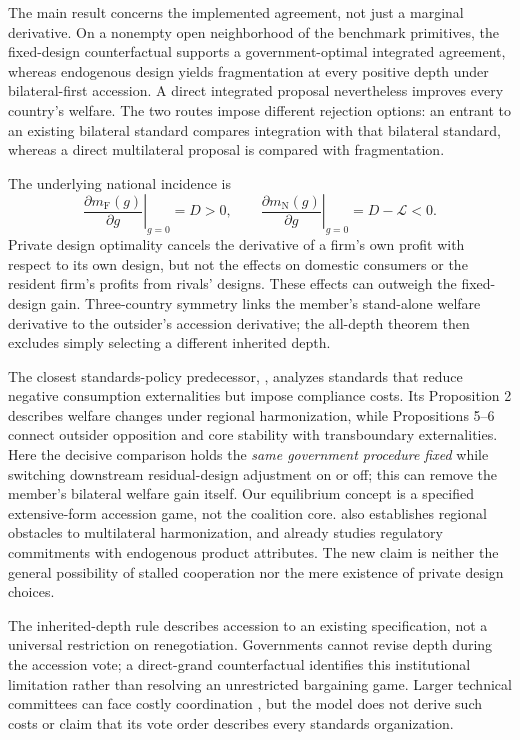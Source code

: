 \documentclass[11pt,a4paper]{article}
\theoremstyle{remark}\newtheorem{remark}[theorem]{Remark}
\newcommand{\N}{\mathrm{N}}\newcommand{\F}{\mathrm{F}}
\newcommand{\loss}{\mathcal L}\newcommand{\vect}[1]{\boldsymbol{#1}}
\begin{document}
The main result concerns the implemented agreement, not just a marginal derivative. On a nonempty open neighborhood of the benchmark primitives, the fixed-design counterfactual supports a government-optimal integrated agreement, whereas endogenous design yields fragmentation at every positive depth under bilateral-first accession. A direct integrated proposal nevertheless improves every country's welfare. The two routes impose different rejection options: an entrant to an existing bilateral standard compares integration with that bilateral standard, whereas a direct multilateral proposal is compared with fragmentation.

The underlying national incidence is
\begin{equation}\label{eq:introheadline}
\left.\frac{\partial m_{\F}(g)}{\partial g}\right|_{g=0}=D>0,\qquad
\left.\frac{\partial m_{\N}(g)}{\partial g}\right|_{g=0}=D-\loss<0.
\end{equation}
Private design optimality cancels the derivative of a firm's own profit with respect to its own design, but not the effects on domestic consumers or the resident firm's profits from rivals' designs. These effects can outweigh the fixed-design gain. Three-country symmetry links the member's stand-alone welfare derivative to the outsider's accession derivative; the all-depth theorem then excludes simply selecting a different inherited depth.

The closest standards-policy predecessor, \citet{Takarada2020}, analyzes standards that reduce negative consumption externalities but impose compliance costs. Its Proposition 2 describes welfare changes under regional harmonization, while Propositions 5--6 connect outsider opposition and core stability with transboundary externalities. Here the decisive comparison holds the \emph{same government procedure fixed} while switching downstream residual-design adjustment on or off; this can remove the member's bilateral welfare gain itself. Our equilibrium concept is a specified extensive-form accession game, not the coalition core. \citet{Kawabata2021} also establishes regional obstacles to multilateral harmonization, and \citet{Grossman2021} already studies regulatory commitments with endogenous product attributes. The new claim is neither the general possibility of stalled cooperation nor the mere existence of private design choices.

The inherited-depth rule describes accession to an existing specification, not a universal restriction on renegotiation. Governments cannot revise depth during the accession vote; a direct-grand counterfactual identifies this institutional limitation rather than resolving an unrestricted bargaining game. Larger technical committees can face costly coordination \citep{Simcoe2012}, but the model does not derive such costs or claim that its vote order describes every standards organization.
\end{document}
